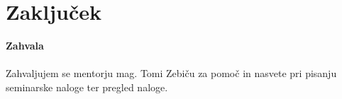 \chapter{Zaključek}

\newpage
\noindent
\large \textbf{Zahvala} \\\\
\small
Zahvaljujem se mentorju mag. Tomi Zebiču za pomoč in nasvete pri pisanju seminarske naloge ter pregled naloge.